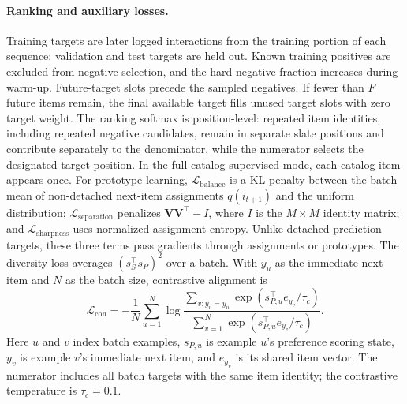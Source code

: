 ﻿\documentclass[sigconf,anonymous,review]{acmart}
\begin{document}
\paragraph{Ranking and auxiliary losses.}
Training targets are later logged interactions from the training portion of each sequence; validation and test targets are held out. Known training positives are excluded from negative selection, and the hard-negative fraction increases during warm-up. Future-target slots precede the sampled negatives. If fewer than $F$ future items remain, the final available target fills unused target slots with zero target weight. The ranking softmax is position-level: repeated item identities, including repeated negative candidates, remain in separate slate positions and contribute separately to the denominator, while the numerator selects the designated target position. In the full-catalog supervised mode, each catalog item appears once. For prototype learning, $\mathcal L_{\mathrm{balance}}$ is a KL penalty between the batch mean of non-detached next-item assignments $q(i_{t+1})$ and the uniform distribution; $\mathcal L_{\mathrm{separation}}$ penalizes $\mathbf V\mathbf V^\top-I$, where $I$ is the $M\times M$ identity matrix; and $\mathcal L_{\mathrm{sharpness}}$ uses normalized assignment entropy. Unlike detached prediction targets, these three terms pass gradients through assignments or prototypes. The diversity loss averages $(s_S^\top s_P)^2$ over a batch. With $y_u$ as the immediate next item and $N$ as the batch size, contrastive alignment is
\begin{equation}
 \mathcal L_{\mathrm{con}}=-\frac{1}{N}\sum_{u=1}^{N}
 \log\frac{\sum_{v:y_v=y_u}\exp(s_{P,u}^\top e_{y_v}/\tau_c)}
 {\sum_{v=1}^{N}\exp(s_{P,u}^\top e_{y_v}/\tau_c)}.
\end{equation}
Here $u$ and $v$ index batch examples, $s_{P,u}$ is example $u$'s preference scoring state, $y_v$ is example $v$'s immediate next item, and $e_{y_v}$ is its shared item vector. The numerator includes all batch targets with the same item identity; the contrastive temperature is $\tau_c=0.1$.
\end{document}
